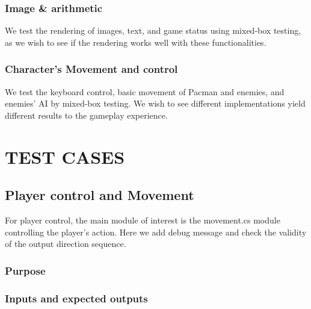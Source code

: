 \documentclass[11pt]{article}
\begin{document}
    \subsubsection*{Image \& arithmetic}
    We test the rendering of images, text, and game status using mixed-box testing, as we wish to see if the rendering works well with these functionalities.

    \subsubsection*{Character's Movement and control}
    We test the keyboard control, basic movement of Pacman and enemies, and enemies' AI by mixed-box testing. We wish to see different implementations yield different results to the gameplay experience.
    
    \section{TEST CASES}
    \subsection*{Player control and Movement}
    For player control, the main module of interest is the movement.cs module controlling the player's action. Here we add debug message and check the validity of the output direction sequence.
    \subsubsection*{Purpose}
    
    \subsubsection*{Inputs and expected outputs}
\end{document}
